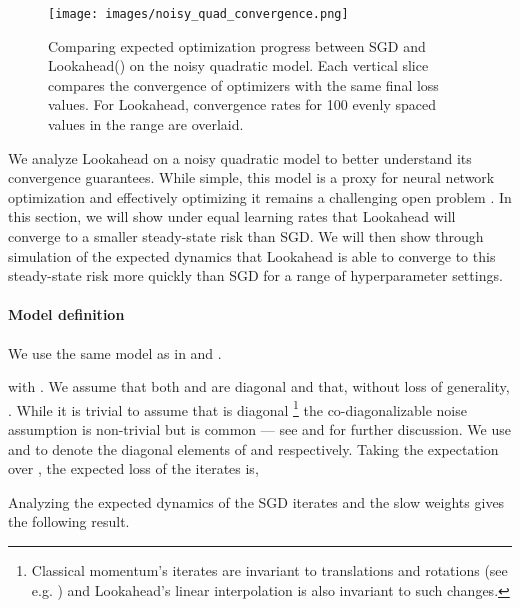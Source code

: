 \documentclass{article}
\begin{document}
\begin{wrapfigure}{t}{0.5 \textwidth}
    \centering
    \vspace{-0.4cm}    \texttt{[image: images/noisy\_quad\_convergence.png]}    \vspace{-0.1cm}    \caption{Comparing expected optimization progress between SGD and Lookahead() on the noisy quadratic model.  Each vertical slice compares the convergence of optimizers with the same final loss values. For Lookahead, convergence rates for 100 evenly spaced  values in the range  are overlaid.}
    \label{fig:noisy_quad_convergence}
    \vspace{-0.4cm}\end{wrapfigure}

We analyze Lookahead on a noisy quadratic model to better understand its convergence guarantees. While simple, this model is a proxy for neural network optimization and effectively optimizing it remains a challenging open problem \citep{schaul2013no, martens2015optimizing, wu2018understanding, zhang2019algorithmic}. In this section, we will show under equal learning rates that Lookahead will converge to a smaller steady-state risk than SGD. We will then show through simulation of the expected dynamics that Lookahead is able to converge to this steady-state risk more quickly than SGD for a range of hyperparameter settings.

\paragraph{Model definition} We use the same model as in \citet{schaul2013no} and \citet{wu2018understanding}. 

with . We assume that both  and  are diagonal and that, without loss of generality, . While it is trivial to assume that  is diagonal \footnote{Classical momentum's iterates are invariant to translations and rotations (see e.g. \citet{sutskever2013importance})  and Lookahead's linear interpolation is also invariant to such changes.} the co-diagonalizable noise assumption is non-trivial but is common --- see \citet{wu2018understanding} and \citet{zhang2019algorithmic} for further discussion. We use  and  to denote the diagonal elements of  and  respectively. Taking the expectation over , the expected loss of the iterates  is,



Analyzing the expected dynamics of the SGD iterates and the slow weights gives the following result.
\end{document}
